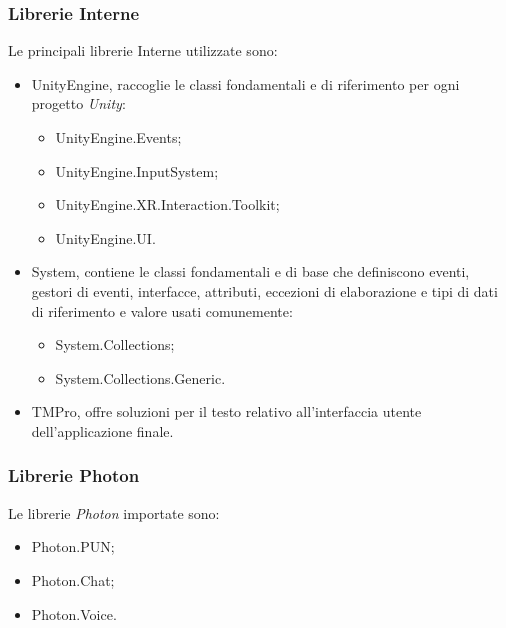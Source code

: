 \subsubsection{Librerie Interne}
Le principali librerie Interne utilizzate sono:
\begin{itemize}
    \item UnityEngine, raccoglie le classi fondamentali e di riferimento per ogni progetto \textit{Unity}: 
    \begin{itemize}
    \item UnityEngine.Events\cite{UnityEvents};
    \item UnityEngine.InputSystem\cite{UnityInputSystem};
    \item UnityEngine.XR.Interaction.Toolkit\cite{XRToolkit};
    \item UnityEngine.UI\cite{UI}.
    \end{itemize}
    \item{System}, contiene le classi fondamentali e di base che definiscono eventi, gestori di eventi, interfacce, attributi, eccezioni di elaborazione e tipi di dati di riferimento e valore usati comunemente:
    \begin{itemize}
    \item System.Collections\cite{Collection};
    \item System.Collections.Generic\cite{CollectionGeneric}.
    \end{itemize}
    \item TMPro\cite{TMP_pro}, offre soluzioni per il testo relativo all'interfaccia utente dell'applicazione finale.
\end{itemize}
\subsubsection{Librerie Photon}
Le librerie \textit{Photon} importate sono:
\begin{itemize}
    \item Photon.PUN\cite{Photon_PUN};
    \item Photon.Chat\cite{Photon_Chat};
    \item Photon.Voice\cite{Photon_Voice}.
\end{itemize}
